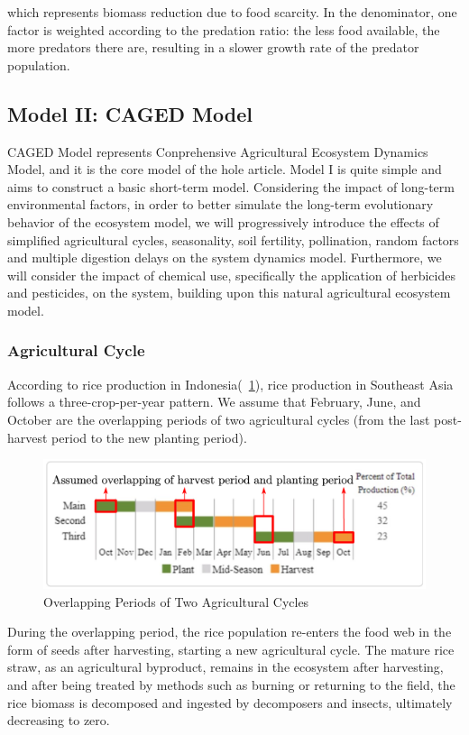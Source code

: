 \documentclass{HZNUMCM}
\begin{document}
          which represents biomass reduction due to food scarcity. 
      In the denominator, one factor is weighted according to the predation ratio: the less food available, 
      the more predators there are, resulting in a slower growth rate of the predator population.
    \subsection{Model II: CAGED Model}
      CAGED Model represents Conprehensive Agricultural Ecosystem Dynamics Model, and it is the core model of the hole article.
      Model I is quite simple and aims to construct a basic short-term model. 
      Considering the impact of long-term environmental factors, 
      in order to better simulate the long-term evolutionary behavior of the ecosystem model, 
      we will progressively introduce the effects of simplified agricultural cycles, 
      seasonality, soil fertility, pollination, random factors and multiple digestion delays on the system dynamics model. 
      Furthermore, we will consider the impact of chemical use, 
      specifically the application of herbicides and pesticides, on the system, 
      building upon this natural agricultural ecosystem model.
      \subsubsection{Agricultural Cycle}
        According to rice production in Indonesia(\figurename~\ref{fig:PlantModePlus}), 
        rice production in Southeast Asia follows a three-crop-per-year pattern. 
        We assume that February, June, and October are the overlapping periods of two agricultural cycles 
        (from the last post-harvest period to the new planting period).
        \begin{figure}[H]
          \centering
          \includegraphics[width=0.7\linewidth]{images/PlantModePlus.png}
          \caption{Overlapping Periods of Two Agricultural Cycles}
          \label{fig:PlantModePlus}
        \end{figure}
        During the overlapping period, the rice population re-enters the food web in the form of seeds after harvesting, 
        starting a new agricultural cycle. The mature rice straw, as an agricultural byproduct, 
        remains in the ecosystem after harvesting, and after being treated by methods such as burning or returning to the field, 
        the rice biomass is decomposed and ingested by decomposers and insects, ultimately decreasing to zero.
\end{document}
